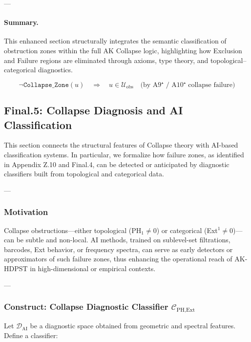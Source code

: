 \documentclass[11pt]{article}
\begin{document}
\begin{axiom}
\begin{axiom}
{{---

\paragraph{Summary.}
This enhanced section structurally integrates the semantic classification of obstruction zones  
within the full AK Collapse logic, highlighting how Exclusion and Failure regions  
are eliminated through axioms, type theory, and topological–categorical diagnostics.

\[
\boxed{
\neg \texttt{Collapse\_Zone}(u) \quad \Rightarrow \quad u \in \mathcal{U}_{\mathrm{obs}} \quad \text{(by A9⁺ / A10⁺ collapse failure)}
}
\]




\subsection*{Final.5: Collapse Diagnosis and AI Classification}

This section connects the structural features of Collapse theory with AI-based classification systems.  
In particular, we formalize how failure zones, as identified in Appendix Z.10 and Final.4,  
can be detected or anticipated by diagnostic classifiers built from topological and categorical data.

---

\subsubsection*{Motivation}

Collapse obstructions—either topological (PH$_1 \neq 0$) or categorical (Ext$^1 \neq 0$)—can be subtle and non-local.  
AI methods, trained on sublevel-set filtrations, barcodes, Ext behavior, or frequency spectra,  
can serve as early detectors or approximators of such failure zones,  
thus enhancing the operational reach of AK-HDPST in high-dimensional or empirical contexts.

---

\subsubsection*{Construct: Collapse Diagnostic Classifier \(\mathcal{C}_{\text{PH,Ext}}\)}

Let \( \mathcal{D}_{\text{AI}} \) be a diagnostic space obtained from geometric and spectral features.  
Define a classifier:

}}
\end{axiom}
\end{axiom}
\end{document}
